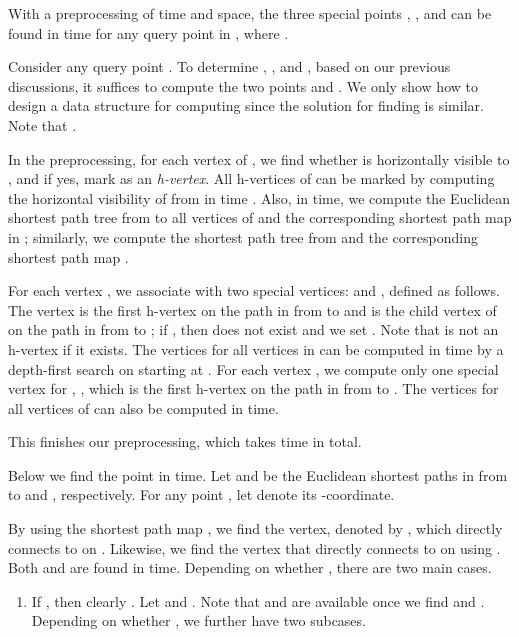 \documentclass[english,runningheads,11pt]{llncs}
\newenvironment{proof}{\noindent {\textbf{Proof:}}\rm}{\hfill \rm}
\begin{document}
\begin{lemma}\label{lem:170}
With a preprocessing of  time and space,
the three special points , , and
 can be found in  time for any query point  in , where .
\end{lemma}
\begin{proof}
Consider any query point . To determine , , and
, based on our previous discussions, it suffices to compute the two points  and .
We only show how to design a data structure for computing  since the solution for finding  is similar.
Note that .

In the preprocessing, for each vertex  of , we find whether  is horizontally
visible to , and if yes, mark  as an {\em h-vertex}. All h-vertices of  can be marked
by computing the horizontal visibility of  from  in  time \cite{ref:JoeCo87,ref:LeeVi83}.
Also, in  time, we compute the Euclidean shortest path
tree  from  to all vertices of  and the corresponding shortest path map
 in  \cite{ref:GuibasLi87}; similarly, we compute the shortest path
tree  from  and the corresponding shortest path map .

For each vertex , we associate  with two special vertices:
 and , defined as follows. The vertex  is the first
h-vertex on the path in  from  to  and  is the child
vertex of  on the path in  from  to ; if ,
then  does not exist and we set . Note that  is
not an h-vertex if it exists. The  vertices for all vertices in  can be computed in  time by a depth-first search on  starting at .
For each vertex , we compute only one special vertex for , , which
is the first h-vertex on the path in  from  to . The  vertices for all vertices of  can also be computed in  time.

This finishes our preprocessing, which takes  time in total.

Below we find the point  in  time.
Let  and  be the Euclidean shortest paths in 
from  to  and , respectively. For any point , let  denote its -coordinate.

By using the shortest path map , we find the vertex, denoted by , which directly connects
to  on . Likewise, we find the vertex  that directly connects to  on
 using . Both  and  are found in  time. Depending on whether , there are two main cases.

\begin{enumerate}
\item
If , then clearly . Let  and . Note that 
and  are available once we find  and . Depending on whether , we further have two subcases.


\end{enumerate}
\end{proof}
\end{document}
